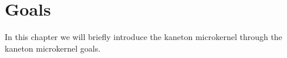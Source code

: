 %
%
%
%
%
%

%
%

\chapter{Goals}

In this chapter we will briefly introduce the kaneton microkernel
through the kaneton microkernel goals.

\newpage

%
%

